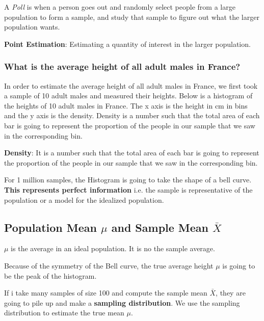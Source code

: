 A \textit{Poll} is when a person goes out and randomly select people from a large population to form a sample, and study that sample to figure out what the larger population wants.


\textbf{Point Estimation}: Estimating a quantity of interest in the larger population.

\subsubsection*{What is the average height of all adult males in France?}
In order to estimate the average height of all adult males in France, we first took a sample of 10 adult males and measured their heights. Below is a histogram of the heights of 10 adult males in France. The x axis is the height in cm in bins and the y axis is the density. Density is a number such that the total area of each bar is going to represent the proportion of the people in our sample that we saw in the corresponding bin.


\textbf{Density}: It is a number such that the total area of each bar is going to represent the proportion of the people in our sample that we saw in the corresponding bin.

For 1 million samples, the Histogram is going to take the shape of a bell curve. \textbf{This represents perfect information} i.e. the sample is representative of the population or a model for the idealized population.

\subsection{Population Mean $\mu$ and Sample Mean $\bar{X}$}

$\mu$ is the average in an ideal population. It is no the sample average.

Because of the symmetry of the Bell curve, the true average height $\mu$ is going to be the peak of the histogram.

If i take many samples of size 100 and compute the sample mean $\bar{X}$, they are going to pile up and make a \textbf{sampling distribution}. We use the sampling distribution to estimate the true mean $\mu$.

